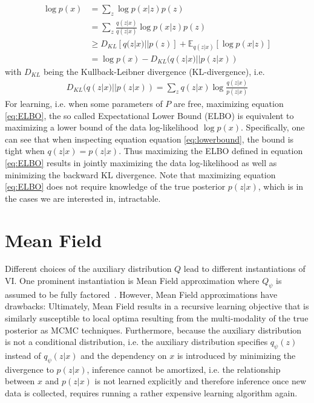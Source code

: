 \documentclass[11pt]{cmuthesis} %
\begin{document}
\begin{align}
\log p(x) &= \sum_z \log p(x|z) p(z)\\
              &= \sum_z \frac{q(z|x)}{q(z|x)} \log p(x|z) p(z)\\
              &\geq D_{KL} [q(z|x) || p(z)] + \mathbb{E}_{q(z|x)} [\log p(x|z)]\label{eq:ELBO}\\
              & = \log p(x) - D_{KL}(q(z|x) || p(z|x)) \label{eq:lowerbound}
\end{align}
with $D_{KL}$ being the Kullback-Leibner divergence (KL-divergence), i.e.
\begin{align*}
D_{KL}(q(z|x) || p(z|x)) = \sum_z q(z|x) \log \frac{q(z|x)}{p(z|x)}
\end{align*}
For learning, i.e. when some parameters of $P$ are free, maximizing equation \ref{eq:ELBO}, the so called Expectational Lower Bound (ELBO) is equivalent to maximizing a lower bound of the data log-likelihood $\log p(x)$. Specifically, one can see that when inspecting equation equation \ref{eq:lowerbound}, the bound is tight when $q(z|x) = p(z|x)$. Thus maximizing the ELBO defined in equation \ref{eq:ELBO} results in jointly maximizing the data log-likelihood as well as minimizing the backward KL divergence. Note that maximizing equation \ref{eq:ELBO} does not require knowledge of the true posterior $p(z|x)$, which is in the cases we are interested in, intractable.

\section{Mean Field}
Different choices of the auxiliary distribution $Q$ lead to different instantiations of VI. One prominent instantiation is Mean Field approximation where $Q_\psi$ is assumed to be fully factored~\cite{ghahramani1996factorial}. However, Mean Field approximations have drawbacks: Ultimately, Mean Field results in a recursive learning objective that is similarly susceptible to local optima resulting from the multi-modality of the true posterior as MCMC techniques. Furthermore, because the auxiliary distribution is not a conditional distribution, i.e. the auxiliary distribution specifies $q_\psi(z)$ instead of $q_\psi(z|x)$ and the dependency on $x$ is introduced by minimizing the divergence to $p(z|x)$, inference cannot be amortized, i.e. the relationship between $x$ and $p(z|x)$ is not learned explicitly and therefore inference once new data is collected, requires running a rather expensive learning algorithm again.
\end{document}
